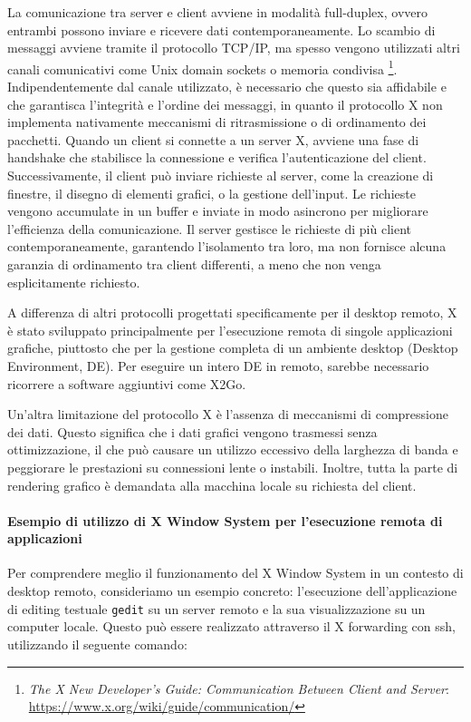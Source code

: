 \documentclass[12pt,a4paper,openright,twoside]{book}
\begin{document}
La comunicazione tra server e client avviene in modalità full-duplex,
ovvero entrambi possono inviare e ricevere dati contemporaneamente.
%
Lo scambio di messaggi avviene tramite il protocollo TCP/IP,
ma spesso vengono utilizzati altri canali comunicativi come Unix domain sockets o memoria condivisa \footnote{\emph{The X New Developer’s Guide: Communication Between Client and Server}: \url{https://www.x.org/wiki/guide/communication/}}.
%
Indipendentemente dal canale utilizzato, è necessario che questo sia affidabile e che garantisca l'integrità e l'ordine dei messaggi,
in quanto il protocollo X non implementa nativamente meccanismi di ritrasmissione o di ordinamento dei pacchetti.
%
Quando un client si connette a un server X, avviene una fase di handshake che stabilisce la connessione e verifica l'autenticazione del client. Successivamente, il client può inviare richieste al server, come la creazione di finestre, il disegno di elementi grafici, o la gestione dell'input. Le richieste vengono accumulate in un buffer e inviate in modo asincrono per migliorare l'efficienza della comunicazione. Il server gestisce le richieste di più client contemporaneamente, garantendo l'isolamento tra loro, ma non fornisce alcuna garanzia di ordinamento tra client differenti, a meno che non venga esplicitamente richiesto.

A differenza di altri protocolli progettati specificamente per il desktop remoto,
X è stato sviluppato principalmente per l'esecuzione remota di singole applicazioni grafiche,
piuttosto che per la gestione completa di un ambiente desktop (Desktop Environment, DE).
%
Per eseguire un intero DE in remoto, sarebbe necessario ricorrere a software aggiuntivi come X2Go.

Un'altra limitazione del protocollo X è l'assenza di meccanismi di compressione dei dati.
Questo significa che i dati grafici vengono trasmessi senza ottimizzazione,
il che può causare un utilizzo eccessivo della larghezza di banda e peggiorare le prestazioni su connessioni lente o instabili.
%
Inoltre, tutta la parte di rendering grafico è demandata alla macchina locale su richiesta del client.

\paragraph{Esempio di utilizzo di X Window System per l'esecuzione remota di applicazioni}

Per comprendere meglio il funzionamento del X Window System in un contesto di desktop remoto, consideriamo un esempio concreto:
l'esecuzione dell'applicazione di editing testuale \texttt{gedit} su un server remoto e la sua visualizzazione su un computer locale.
Questo può essere realizzato attraverso il X forwarding con ssh, utilizzando il seguente comando:
\end{document}
